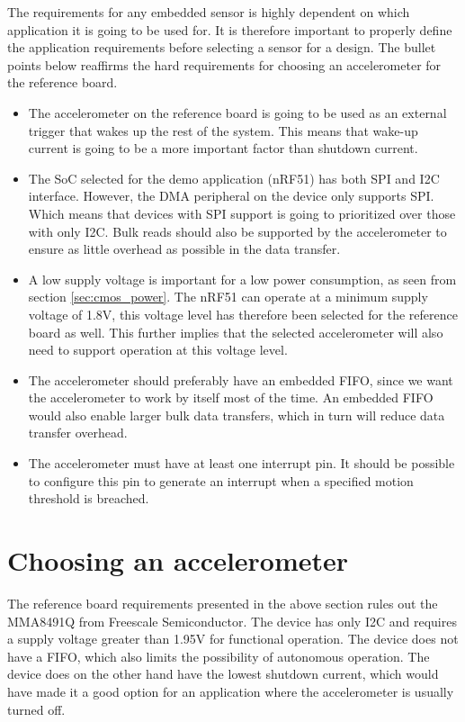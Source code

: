 The requirements for any embedded sensor is highly dependent on which application it is going to be used for. It is therefore important to properly define the application requirements before selecting a sensor for a design. The bullet points below reaffirms the hard requirements for choosing an accelerometer for the reference board. 

\begin{itemize}
\item The accelerometer on the reference board is going to be used as an external trigger that wakes up the rest of the system. This means that wake-up current is going to be a more important factor than shutdown current.
\item The SoC selected for the demo application (nRF51) has both SPI and I2C interface. However, the DMA peripheral on the device only supports SPI. Which means that devices with SPI support is going to prioritized over those with only I2C. Bulk reads should also be supported by the accelerometer to ensure as little overhead as possible in the data transfer. 
\item A low supply voltage is important for a low power consumption, as seen from section \ref{sec:cmos_power}. The nRF51 can operate at a minimum supply voltage of 1.8V, this voltage level has therefore been selected for the reference board as well. This further implies that the selected accelerometer will also need to support operation at this voltage level.
\item The accelerometer should preferably have an embedded FIFO, since we want the accelerometer to work by itself most of the time. An embedded FIFO would also enable larger bulk data transfers, which in turn will reduce data transfer overhead.
\item The accelerometer must have at least one interrupt pin. It should be possible to configure this pin to generate an interrupt when a specified motion threshold is breached.
\end{itemize}

\section{Choosing an accelerometer}

The reference board requirements presented in the above section rules out the MMA8491Q from Freescale Semiconductor. The device has only I2C and requires a supply voltage greater than 1.95V for functional operation. The device does not have a FIFO, which also limits the possibility of autonomous operation. The device does on the other hand have the lowest shutdown current, which would have made it a good option for an application where the accelerometer is usually turned off. 

